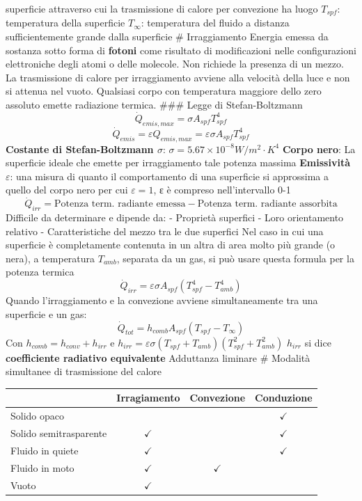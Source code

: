 superficie attraverso cui la trasmissione di calore per convezione ha
luogo \(T_{spf}\): temperatura della superficie \(T_{\infty}\):
temperatura del fluido a distanza sufficientemente grande dalla
superficie \# Irraggiamento Energia emessa da sostanza sotto forma di
\textbf{fotoni} come risultato di modificazioni nelle configurazioni
elettroniche degli atomi o delle molecole. Non richiede la presenza di
un mezzo. La trasmissione di calore per irraggiamento avviene alla
velocità della luce e non si attenua nel vuoto. Qualsiasi corpo con
temperatura maggiore dello zero assoluto emette radiazione termica.
\#\#\# Legge di Stefan-Boltzmann
\[\dot Q_{emis, max}=\sigma A_{spf}T_{spf}^4\]
\[\dot Q_{emis}=\varepsilon Q_{emis,max}=\varepsilon\sigma A_{spf}T_{spf}^4\]
\textbf{Costante di Stefan-Boltzmann \(\sigma\)}:
\(\sigma=5.67 \times 10^{-8}W/m^2 \cdot K^4\) \textbf{Corpo nero}: La
superficie ideale che emette per irraggiamento tale potenza massima
\textbf{Emissività \(\varepsilon\)}: una misura di quanto il
comportamento di una superficie si approssima a quello del corpo nero
per cui \(\varepsilon = 1\), ε è compreso nell'intervallo 0-1
\[\dot Q_{irr}=\text{Potenza term. radiante emessa}-\text{Potenza term. radiante assorbita}\]
Difficile da determinare e dipende da: - Proprietà superfici - Loro
orientamento relativo - Caratteristiche del mezzo tra le due superfici
Nel caso in cui una superficie è completamente contenuta in un altra di
area molto più grande (o nera), a temperatura \(T_{amb}\), separata da
un gas, si può usare questa formula per la potenza termica
\[\dot Q_{irr}=\varepsilon\sigma A_{spf}(T_{spf}^4-T_{amb}^4)\] Quando
l'irraggiamento e la convezione avviene simultaneamente tra una
superficie e un gas:
\[\dot Q_{tot}=h_{comb}A_{spf}(T_{spf}-T_{\infty})\] Con
\(h_{comb}=h_{conv}+h_{irr}\) e
\(h_{irr}=\varepsilon\sigma(T_{spf}+T_{amb})(T_{spf}^2+T_{amb}^2)\)
\(h_{irr}\) si dice \textbf{coefficiente radiativo equivalente}
Adduttanza liminare \# Modalità simultanee di trasmissione del calore

\begin{longtable}[]{@{}lccc@{}}
\toprule
& Irragiamento & Convezione & Conduzione\tabularnewline
\midrule
\endhead
Solido opaco & & & \(\checkmark\)\tabularnewline
Solido semitrasparente & \(\checkmark\) & &
\(\checkmark\)\tabularnewline
Fluido in quiete & \(\checkmark\) & & \(\checkmark\)\tabularnewline
Fluido in moto & \(\checkmark\) & \(\checkmark\) &\tabularnewline
Vuoto & \(\checkmark\) & &\tabularnewline
\bottomrule
\end{longtable}

